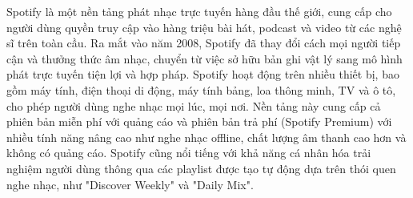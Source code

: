 Spotify là một nền tảng phát nhạc trực tuyến hàng đầu thế giới, cung cấp cho người dùng quyền truy cập vào hàng triệu bài hát, podcast và video từ các nghệ sĩ trên toàn cầu. Ra mắt vào năm 2008, Spotify đã thay đổi cách mọi người tiếp cận và thưởng thức âm nhạc, chuyển từ việc sở hữu bản ghi vật lý sang mô hình phát trực tuyến tiện lợi và hợp pháp.
Spotify hoạt động trên nhiều thiết bị, bao gồm máy tính, điện thoại di động, máy tính bảng, loa thông minh, TV và ô tô, cho phép người dùng nghe nhạc mọi lúc, mọi nơi. Nền tảng này cung cấp cả phiên bản miễn phí với quảng cáo và phiên bản trả phí (Spotify Premium) với nhiều tính năng nâng cao như nghe nhạc offline, chất lượng âm thanh cao hơn và không có quảng cáo. Spotify cũng nổi tiếng với khả năng cá nhân hóa trải nghiệm người dùng thông qua các playlist được tạo tự động dựa trên thói quen nghe nhạc, như "Discover Weekly" và "Daily Mix".